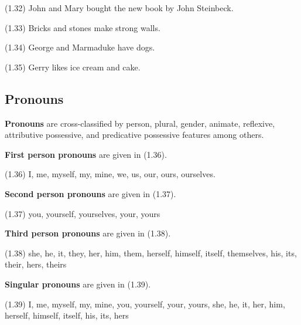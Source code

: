 \documentclass{article}
\begin{document}
\begin{enumerate*}
\item[(1.32)] John and Mary bought the new book by John
Steinbeck.
\item[(1.33)] Bricks and stones make strong walls.
\item[(1.34)] George and Marmaduke have dogs.
\item[(1.35)] Gerry likes ice cream and cake.
\end{enumerate*}


\subsection{Pronouns}

\textbf{Pronouns} are cross-classified by person, plural,
gender, animate, reflexive, attributive possessive, and
predicative possessive features among others.

\textbf{First person pronouns} are given in (1.36).

\begin{enumerate*}
\item[(1.36)] I, me, myself, my, mine, we, us, our,
ours, ourselves. 
\end{enumerate*}

\textbf{Second person pronouns} are given in (1.37).

\begin{enumerate*}
\item[(1.37)] you, yourself, yourselves, your, yours
\end{enumerate*}

\textbf{Third person pronouns} are given in (1.38).

\begin{enumerate*}
\item[(1.38)] she, he, it, they, her, him, them, herself,
himself, itself, themselves, his, its, their, hers, theirs
\end{enumerate*}

\textbf{Singular pronouns} are given in (1.39).

\begin{enumerate*}
\item[(1.39)] I, me, myself, my, mine, you, yourself, your,
yours, she, he, it, her, him, herself, himself, itself, his,
its, hers
\end{enumerate*}
\end{document}
